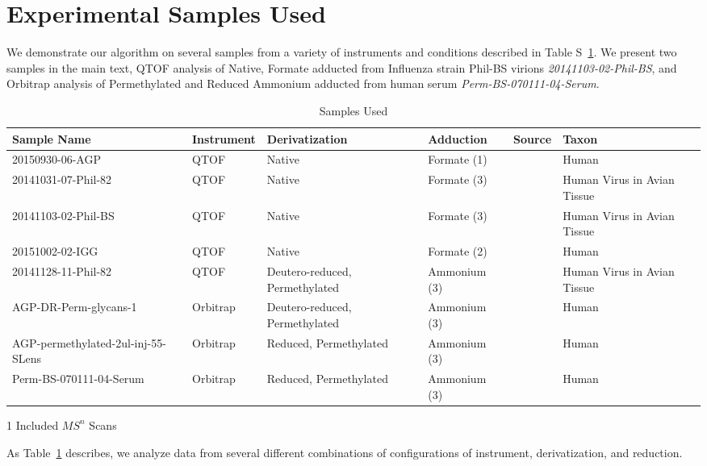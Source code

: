 \section{Experimental Samples Used}\label{sec:sample_description}
    We demonstrate our algorithm on several samples from a variety of
    instruments and conditions described in Table S~\ref{tab:sample_overview}.
    We present two samples in the main text,
    QTOF analysis of Native, Formate adducted \nglycans from Influenza
    strain Phil-BS virions \textit{20141103-02-Phil-BS}, and Orbitrap analysis
    of Permethylated and Reduced Ammonium adducted \nglycans from human
    serum \textit{Perm-BS-070111-04-Serum}.

    \begin{table}[!h]
    \scriptsize
    \centering
    \begin{threeparttable}
    \begin{tabular}{p{4.1cm} | p{1.5cm} | p{2.5cm} | p{2cm} | p{3cm} | p{2cm}}
        \toprule
        Sample Name & Instrument & Derivatization & Adduction & Source & Taxon  \\
        \midrule
        20150930-06-AGP & QTOF & Native & Formate (1) & \cite{Khatri2016a} & Human\\
        20141031-07-Phil-82 & QTOF & Native & Formate (3) & \cite{Khatri2016a} & Human Virus in Avian Tissue\\
        20141103-02-Phil-BS & QTOF & Native & Formate (3) & \cite{Khatri2016a} & Human Virus in Avian Tissue\\
        20151002-02-IGG & QTOF & Native & Formate (2) & \cite{Khatri2016b} & Human\\
        20141128-11-Phil-82\tnote{1} & QTOF &
            Deutero-reduced, Permethylated & Ammonium (3) & \cite{Khatri2016a} & Human Virus in Avian Tissue\\
        AGP-DR-Perm-glycans-1\tnote{1} & Orbitrap &
            Deutero-reduced, Permethylated & Ammonium (3) & \cite{Khatri2016a} & Human\\
        AGP-permethylated-2ul-inj-55-SLens\tnote{1} & Orbitrap &
            Reduced, Permethylated & Ammonium (3) & \cite{Khatri2016a} & Human\\
        Perm-BS-070111-04-Serum\tnote{1} & Orbitrap &
            Reduced, Permethylated & Ammonium (3) & \cite{Yu2013,Hu2012} & Human\\
    \end{tabular}
    \begin{tablenotes}
        \item[1] Included $MS^n$ Scans
    \end{tablenotes}
    \end{threeparttable}
    \caption{Samples Used}\label{tab:sample_overview}
    \end{table}

    \FloatBarrier

    As Table~\ref{tab:sample_overview} describes, we analyze data from several different
    combinations of configurations of instrument, derivatization, and reduction.
